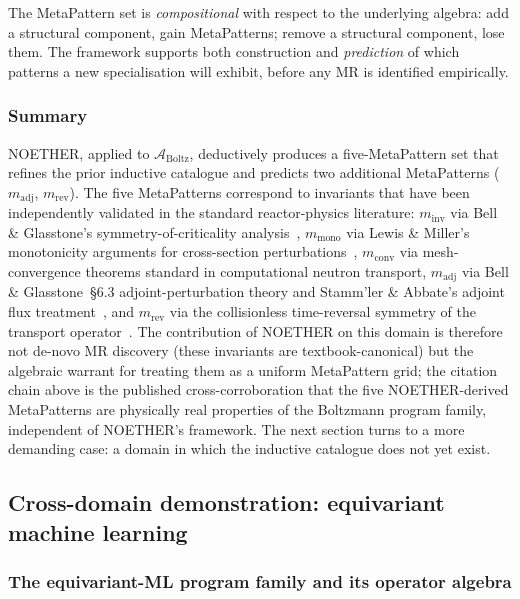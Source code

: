 \documentclass[acmsmall,screen,review]{acmart}
\begin{document}
The MetaPattern set is \emph{compositional} with respect to the underlying algebra: add a structural component, gain MetaPatterns; remove a structural component, lose them. The framework supports both construction and \emph{prediction} of which patterns a new specialisation will exhibit, before any MR is identified empirically.

\subsubsection{Summary}

NOETHER, applied to $\mathcal{A}_{\mathrm{Boltz}}$, deductively produces a five-MetaPattern set that refines the prior inductive catalogue and predicts two additional MetaPatterns ($m_{\mathrm{adj}}$, $m_{\mathrm{rev}}$). The five MetaPatterns correspond to invariants that have been independently validated in the standard reactor-physics literature: $m_{\mathrm{inv}}$ via Bell \& Glasstone's symmetry-of-criticality analysis~\cite{BellGlasstone1970}, $m_{\mathrm{mono}}$ via Lewis \& Miller's monotonicity arguments for cross-section perturbations~\cite{LewisMiller1993}, $m_{\mathrm{conv}}$ via mesh-convergence theorems standard in computational neutron transport, $m_{\mathrm{adj}}$ via Bell \& Glasstone~\S6.3 adjoint-perturbation theory and Stamm'ler \& Abbate's adjoint flux treatment~\cite{StammlerAbbate1983}, and $m_{\mathrm{rev}}$ via the collisionless time-reversal symmetry of the transport operator~\cite{LewisMiller1993}. The contribution of NOETHER on this domain is therefore not de-novo MR discovery (these invariants are textbook-canonical) but the algebraic warrant for treating them as a uniform MetaPattern grid; the citation chain above is the published cross-corroboration that the five NOETHER-derived MetaPatterns are physically real properties of the Boltzmann program family, independent of NOETHER's framework. The next section turns to a more demanding case: a domain in which the inductive catalogue does not yet exist.

\subsection{Cross-domain demonstration: equivariant machine learning}
\label{sec:cross-domain}

\subsubsection{The equivariant-ML program family and its operator algebra}
\end{document}
